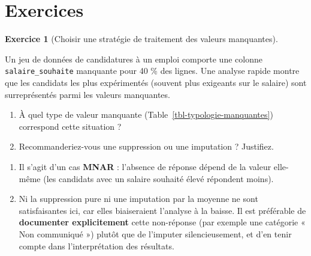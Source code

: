 \documentclass[
  french,
  letterpaper,
  open=any]{scrbook}
\providecommand{\tightlist}{%
  \setlength{\itemsep}{0pt}\setlength{\parskip}{0pt}}
\theoremstyle{definition}
\theoremstyle{definition}
\newtheorem{exercise}{Exercice}[section]
\theoremstyle{remark}
\begin{document}
\section{Exercices}\label{exercices-1}

\begin{exercise}[Choisir une stratégie de traitement des valeurs
manquantes]\protect\hypertarget{exr-prep-1}{}\label{exr-prep-1}

Un jeu de données de candidatures à un emploi comporte une colonne
\texttt{salaire\_souhaite} manquante pour 40 \% des lignes. Une analyse
rapide montre que les candidats les plus expérimentés (souvent plus
exigeants sur le salaire) sont surreprésentés parmi les valeurs
manquantes.

\begin{enumerate}
\def\labelenumi{\alph{enumi}.}
\tightlist
\item
  À quel type de valeur manquante (Table~\ref{tbl-typologie-manquantes})
  correspond cette situation ?
\item
  Recommanderiez-vous une suppression ou une imputation ? Justifiez.
\end{enumerate}

\end{exercise}

\begin{tcolorbox}[enhanced jigsaw, arc=.35mm, bottomrule=.15mm, bottomtitle=1mm, breakable, colback=white, colbacktitle=quarto-callout-tip-color!10!white, colframe=quarto-callout-tip-color-frame, coltitle=black, left=2mm, leftrule=.75mm, opacityback=0, opacitybacktitle=0.6, rightrule=.15mm, title=\textcolor{quarto-callout-tip-color}{\faLightbulb}\hspace{0.5em}{Solution de l'exercice Exercice~\ref{exr-prep-1}}, titlerule=0mm, toprule=.15mm, toptitle=1mm]

\begin{enumerate}
\def\labelenumi{\alph{enumi}.}
\tightlist
\item
  Il s'agit d'un cas \textbf{MNAR} : l'absence de réponse dépend de la
  valeur elle-même (les candidats avec un salaire souhaité élevé
  répondent moins).
\item
  Ni la suppression pure ni une imputation par la moyenne ne sont
  satisfaisantes ici, car elles biaiseraient l'analyse à la baisse. Il
  est préférable de \textbf{documenter explicitement} cette non-réponse
  (par exemple une catégorie « Non communiqué ») plutôt que de l'imputer
  silencieusement, et d'en tenir compte dans l'interprétation des
  résultats.
\end{enumerate}

\end{tcolorbox}
\end{document}
